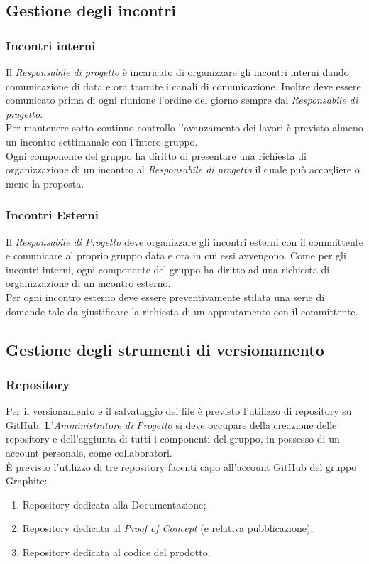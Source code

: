\documentclass[../NormediProgetto.tex]{subfiles}
\begin{document}
	\subsection{Gestione degli incontri}
	
	\subsubsection{Incontri interni}
	
	Il \textit{Responsabile di progetto} è incaricato di organizzare gli incontri interni dando comunicazione di data e ora tramite i canali di comunicazione. Inoltre deve essere comunicato prima di ogni riunione l'ordine del giorno sempre dal \textit{Responsabile di progetto}.
	\\ \noindent Per mantenere sotto continuo controllo l'avanzamento dei lavori è previsto almeno un incontro settimanale con l'intero gruppo.
	\\ \noindent Ogni componente del gruppo ha diritto di presentare una richiesta di organizzazione di un incontro al \textit{Responsabile di progetto} il quale può accogliere o meno la proposta.
	
	\subsubsection{Incontri Esterni}
	
	Il \textit{Responsabile di Progetto} deve organizzare gli incontri esterni con il committente e comunicare al proprio gruppo data e ora in cui essi avvengono. Come per gli incontri interni, ogni componente del gruppo ha diritto ad una richiesta di organizzazione di un incontro esterno.
	\\ \noindent Per ogni incontro esterno deve essere preventivamente stilata una serie di domande tale da giustificare la richiesta di un appuntamento con il committente.
	
	\subsection{Gestione degli strumenti di versionamento}
	
	\subsubsection{Repository}
	
	Per il versionamento e il salvataggio dei file è previsto l'utilizzo di repository su GitHub. L'\textit{Amministratore di Progetto} si deve occupare della creazione delle repository e dell'aggiunta di tutti i componenti del gruppo, in possesso di un account personale, come collaboratori.
	\\ \noindent È previsto l'utilizzo di tre repository facenti capo all'account GitHub del gruppo Graphite:
	\begin{enumerate}
		\item Repository dedicata alla Documentazione;
		\item Repository dedicata al \textit{Proof of Concept} (e relativa pubblicazione);
		\item Repository dedicata al codice del prodotto.
	\end{enumerate}
	
\end{document}
